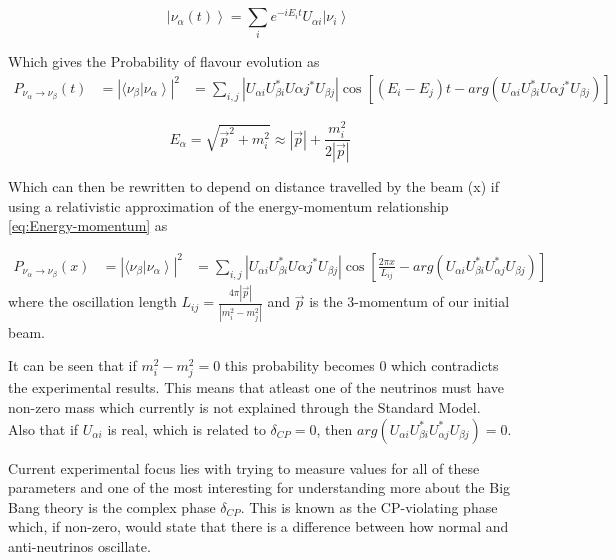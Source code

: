 \begin{equation}
\label{eq:eigenstatesTime}
 \left| \nu_\alpha (t) \right\rangle = \sum_{i} e^{-i E_i t} U_{\alpha i} \left| \nu_i \right\rangle\
 \end{equation}

Which gives the Probability of flavour evolution as 
\begin{equation}
\begin{aligned}
P_{\nu_\alpha \rightarrow \nu_\beta} (t) &= \left|  \langle \nu_\beta \left| \nu_\alpha     \right\rangle  \right|^2
& = \sum_{i,j} \left| U_{\alpha i} U_{\beta i}^* U{\alpha j}^* U_{\beta j} \right| \cos[(E_i - E_j)t -arg(U_{\alpha i} U_{\beta i}^* U{\alpha j}^* U_{\beta j} ) ]
\end{aligned}
\end{equation}

\begin{equation}
\label{eq:Energy-momentum}
E_\alpha = \sqrt{\vec{p}^2 + m_i^2} \approx \left| \vec{p} \right| + \frac{m_i^2}{2\left| \vec{p} \right|}
\end{equation}

Which can then be rewritten to depend on distance travelled by the beam (x) if using a relativistic approximation of the  energy-momentum relationship \ref{eq:Energy-momentum} as

\begin{equation}
\label{eq:Problength}
\begin{aligned}
P_{\nu_\alpha \rightarrow \nu_\beta} (x) &= \left|  \langle \nu_\beta \left| \nu_\alpha     \right\rangle  \right|^2
& = \sum_{i,j} \left| U_{\alpha i} U_{\beta i}^* U{\alpha j}^* U_{\beta j} \right| \cos[\frac{2\pi x}{L_{ij}} -arg(U_{\alpha i} U_{\beta i}^* U_{\alpha j}^* U_{\beta j} ) ]
\end{aligned}
\end{equation}
where the oscillation length $L_{ij} = \frac{4\pi  \left| \vec{p} \right| }{\left| m_i^2 - m_j^2 \right|}$ and $\vec{p}$ is the 3-momentum of our initial beam.

It can be seen that if $m_i^2 - m_j^2 = 0 $ this probability becomes $0$ which contradicts the experimental results. This means that atleast one of the neutrinos must have non-zero mass which currently is not explained through the Standard Model. Also that if $U_{\alpha i}$ is real, which is related to $\delta_{CP} = 0$, then $arg(U_{\alpha i} U_{\beta i}^* U_{\alpha j}^* U_{\beta j} ) = 0$.

Current experimental focus lies with trying to measure values for all of these parameters and one of the most interesting for understanding more about the Big Bang theory is the complex phase $\delta_{CP}$. This is known as the CP-violating phase which, if non-zero, would state that there is a difference between how normal and anti-neutrinos oscillate.

